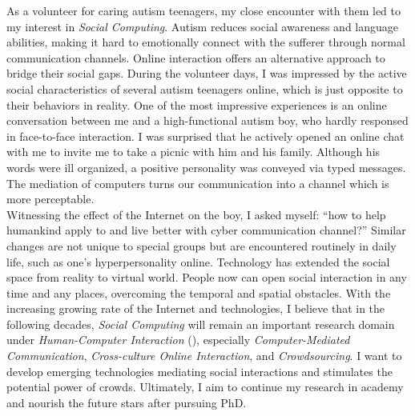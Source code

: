 As a volunteer for caring autism teenagers, my close encounter with them led to my interest in \textit{Social Computing}. 
Autism reduces social awareness and language abilities, 
making it hard to emotionally connect with the sufferer through normal communication channels.
Online interaction offers an alternative approach to bridge their social gaps.
During the volunteer days, I was impressed by the active social characteristics of several autism teenagers online,
which is just opposite to their behaviors in reality.
One of the most impressive experiences is an online conversation between me and a high-functional autism boy,
who hardly responsed in face-to-face interaction.
I was surprised that he actively opened an online chat with me to invite me to take a picnic with him and his family.
Although his words were ill organized, a positive personality was conveyed via typed messages.
The mediation of computers turns our communication into a channel which is more perceptable.\\

\noindent
Witnessing the effect of the Internet on the boy, I asked myself:
``how to help humankind apply to and live better with cyber communication channel?''
Similar changes are not unique to special groups but are encountered routinely in daily life,
such as one's hyperpersonality online.
Technology has extended the social space from reality to virtual world.
People now can open social interaction in any time and any places, overcoming the temporal and spatial obstacles.
With the increasing growing rate of the Internet and technologies, I believe that in the following decades, 
\textit{Social Computing} will remain an important research domain under \textit{Human-Computer Interaction} (),
especially \textit{Computer-Mediated Communication}, \textit{Cross-culture Online Interaction}, and \textit{Crowdsourcing}.
I want to develop emerging technologies mediating social interactions and stimulates the potential power of crowds. 
Ultimately, I aim to continue my research in academy and nourish the future stars after pursuing PhD.\\




